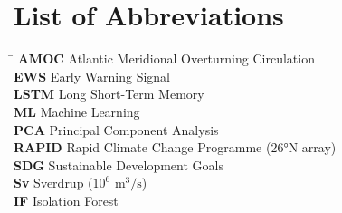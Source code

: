 \chapter*{List of Abbreviations}

\begin{tabbing}
\hspace{3.5cm} \= \kill
\textbf{AMOC} \> Atlantic Meridional Overturning Circulation \\
\textbf{EWS} \> Early Warning Signal \\
\textbf{LSTM} \> Long Short-Term Memory \\
\textbf{ML} \> Machine Learning \\
\textbf{PCA} \> Principal Component Analysis \\
\textbf{RAPID} \> Rapid Climate Change Programme (26°N array) \\
\textbf{SDG} \> Sustainable Development Goals \\
\textbf{Sv} \> Sverdrup ($10^6 \text{ m}^3/\text{s}$) \\
\textbf{IF} \> Isolation Forest \\
\end{tabbing}

\cleardoublepage